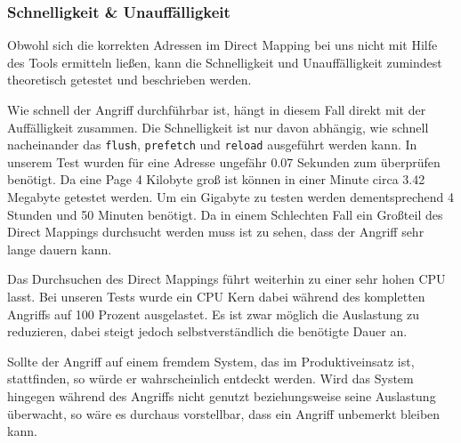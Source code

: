 \subsubsection{Schnelligkeit \& Unauffälligkeit}
Obwohl sich die korrekten Adressen im Direct Mapping bei uns nicht mit Hilfe des Tools ermitteln ließen, kann die Schnelligkeit und Unauffälligkeit zumindest theoretisch getestet und beschrieben werden.

Wie schnell der Angriff durchführbar ist, hängt in diesem Fall direkt mit der Auffälligkeit zusammen. Die Schnelligkeit ist nur davon abhängig, wie schnell nacheinander das \texttt{flush}, \texttt{prefetch} und \texttt{reload} ausgeführt werden kann. In unserem Test wurden für eine Adresse ungefähr 0.07 Sekunden zum überprüfen benötigt. Da eine Page 4 Kilobyte groß ist können in einer Minute circa 3.42 Megabyte getestet werden. Um ein Gigabyte zu testen werden dementsprechend 4 Stunden und 50 Minuten benötigt. Da in einem Schlechten Fall ein Großteil des Direct Mappings durchsucht werden muss ist zu sehen, dass der Angriff sehr lange dauern kann.

Das Durchsuchen des Direct Mappings führt weiterhin zu einer sehr hohen CPU lasst. Bei unseren Tests wurde ein CPU Kern dabei während des kompletten Angriffs auf 100 Prozent ausgelastet. Es ist zwar möglich die Auslastung zu reduzieren, dabei steigt jedoch selbstverständlich die benötigte Dauer an.

Sollte der Angriff auf einem fremdem System, das im Produktiveinsatz ist, stattfinden, so würde er wahrscheinlich entdeckt werden. Wird das System hingegen während des Angriffs nicht genutzt beziehungsweise seine Auslastung überwacht, so wäre es durchaus vorstellbar, dass ein Angriff unbemerkt bleiben kann.



